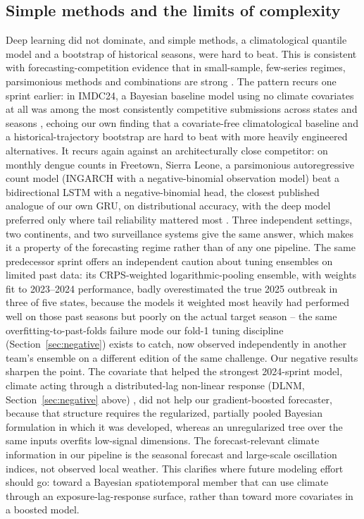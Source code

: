 \documentclass[11pt]{article}
\begin{document}
\subsection{Simple methods and the limits of complexity}
Deep learning did not dominate, and simple methods, a climatological quantile model and a bootstrap
of historical seasons, were hard to beat. This is consistent with forecasting-competition evidence
that in small-sample, few-series regimes, parsimonious methods and combinations are strong
\citep{makridakis2020,benjarattanaporn2026}. The pattern recurs one sprint earlier: in IMDC24, a
Bayesian baseline model using no climate covariates at all was among the most consistently
competitive submissions across states and seasons \citep{araujo2026}, echoing our own finding that
a covariate-free climatological baseline and a historical-trajectory bootstrap are hard to beat
with more heavily engineered alternatives. It recurs again against an architecturally close
competitor: on monthly dengue counts in Freetown, Sierra Leone, a parsimonious autoregressive count
model (INGARCH with a negative-binomial observation model) beat a bidirectional LSTM with a
negative-binomial head, the closest published analogue of our own GRU, on distributional accuracy,
with the deep model preferred only where tail reliability mattered most \citep{sesay2026}. Three
independent settings, two continents, and two surveillance systems give the same answer, which
makes it a property of the forecasting regime rather than of any one pipeline. The same predecessor sprint offers an independent caution about tuning ensembles on
limited past data: its CRPS-weighted logarithmic-pooling ensemble, with weights fit to 2023--2024
performance, badly overestimated the true 2025 outbreak in three of five states, because the
models it weighted most heavily had performed well on those past seasons but poorly on the actual
target season \citep{araujo2026} -- the same overfitting-to-past-folds failure mode our fold-1
tuning discipline (Section~\ref{sec:negative}) exists to catch, now observed independently in
another team's ensemble on a different edition of the same challenge. Our negative results sharpen
the point. The covariate that helped the
strongest 2024-sprint model, climate acting through a distributed-lag non-linear response
(DLNM, Section~\ref{sec:negative} above) \citep{lowe2021,gasparrini2010}, did not help our gradient-boosted forecaster, because that
structure requires the regularized, partially pooled Bayesian formulation in which it was developed,
whereas an unregularized tree over the same inputs overfits low-signal dimensions. The forecast-relevant
climate information in our pipeline is the seasonal forecast and large-scale oscillation indices, not
observed local weather. This clarifies where future modeling effort should go: toward a Bayesian
spatiotemporal member that can use climate through an exposure-lag-response surface, rather than
toward more covariates in a boosted model.
\end{document}
